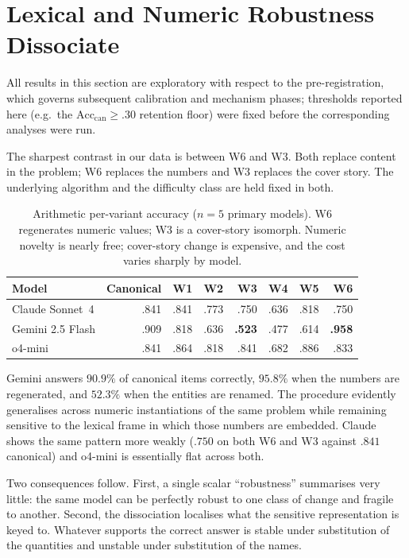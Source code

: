 \documentclass{article}
\begin{document}
\section{Lexical and Numeric Robustness Dissociate}

All results in this section are exploratory with respect to the pre-registration,
which governs subsequent calibration and mechanism phases; thresholds reported here
(e.g.\ the $\mathrm{Acc}_{\mathrm{can}} \geq .30$ retention floor) were fixed before
the corresponding analyses were run.

The sharpest contrast in our data is between W6 and W3. Both replace content in the
problem; W6 replaces the numbers and W3 replaces the cover story. The underlying algorithm
and the difficulty class are held fixed in both.

\begin{table}[t]
\centering
\caption{Arithmetic per-variant accuracy ($n{=}5$ primary models). W6 regenerates numeric values; W3 is a
cover-story isomorph. Numeric novelty is nearly free; cover-story change is expensive, and the cost
varies sharply by model.}
\label{tab:gsm}
\small
\begin{tabular}{lrrrrrrr}
\toprule
Model & Canonical & W1 & W2 & W3 & W4 & W5 & W6 \\
\midrule
Claude Sonnet~4 & .841 & .841 & .773 & .750 & .636 & .818 & .750 \\
Gemini 2.5 Flash & .909 & .818 & .636 & \textbf{.523} & .477 & .614 & \textbf{.958} \\
o4-mini & .841 & .864 & .818 & .841 & .682 & .886 & .833 \\
\bottomrule
\end{tabular}
\end{table}

Gemini answers $90.9\%$ of canonical items correctly, $95.8\%$ when the numbers are
regenerated, and $52.3\%$ when the entities are renamed. The procedure evidently
generalises across numeric instantiations of the same problem while remaining
sensitive to the lexical frame in which those numbers are embedded. Claude shows the
same pattern more weakly ($.750$ on both W6 and W3 against $.841$ canonical) and
o4-mini is essentially flat across both.

Two consequences follow. First, a single scalar ``robustness'' summarises very
little: the same model can be perfectly robust to one class of change and fragile to
another. Second, the dissociation localises what the sensitive representation is
keyed to. Whatever supports the correct answer is stable under substitution of the
quantities and unstable under substitution of the names.
\end{document}
